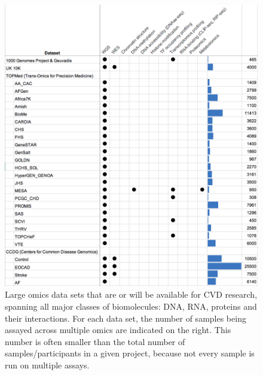 \documentclass[letter]{bioinfo}
\begin{document}
	\begin{figure}[!tpb]
	\includegraphics[width=1\linewidth]{trans-omics-data-sets.png}
		\caption{Large omics data sets that are or will be available for CVD research, spanning all major classes of biomolecules: DNA, RNA, proteins and their interactions. For each data set, the number of samples being assayed across multiple omics are indicated on the right. This number is often smaller than the total number of samples/participants in a given project, because not every sample is run on multiple assays.}
		\label{fig:trans-omics}
	\end{figure} 
	
\end{document}
